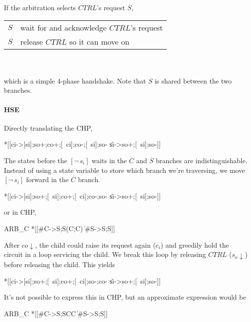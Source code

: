 \documentclass{article}
\begin{document}
\noindent If the arbitration selects $CTRL$'s request $\overline{S}$,

\begin{tabular}[]{rl}
  $S$ & wait for and acknowledge $CTRL$'s request \\
  $S$ & release $CTRL$ so it can move on \\
\end{tabular} \\ \\

\noindent which is a simple 4-phase handshake. Note that $S$ is shared between the two branches.

\paragraph{HSE}

Directly translating the CHP,

\begin{hse}
*[[ci->[si];so+;co+;[~ci];co-;[~si];so-
  \|si->so+;[~si];so-]]
\end{hse}

The states before the $[\neg\,s_i]$ waits in the $\overline{C}$ and $\overline{S}$ branches are indistinguishable. Instead of using a state variable to store which branch we're traversing, we move $[\neg\,s_i]$ forward in the $\overline{C}$ branch. 

\begin{hse}
*[[ci->[si];so+;[~si];co+;[~ci];co-;so-
  \|si->so+;[~si];so-]]
\end{hse}

\noindent or in CHP,

\begin{csp}
ARB_C\equiv
*[[#C->S;S\star(C;C)
  \|#S->S;S]]
\end{csp}

\noindent After $co\!\downarrow$, the child could raise its request again ($c_i$) and greedily hold the circuit in a loop servicing the child. 
We break this loop by releasing $CTRL$ ($s_o\!\downarrow$) before releasing the child. This yields

\begin{hse}
*[[ci->[si];so+;[~si];co+;[~ci];so-;co-
  \|si->so+;[~si];so-]]
\end{hse}

\noindent It's not possible to express this in CHP, but an approximate expression would be

\begin{csp}
ARB_C\equiv
*[[#C->S;S\star\!C\star\!C
  \|#S->S;S]]
\end{csp}
\end{document}
